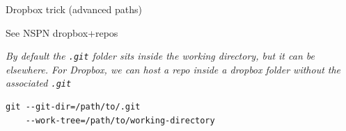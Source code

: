 \begin{frame}[fragile]{Dropbox trick (advanced paths)}
  
  See NSPN dropbox+repos


  \itshape\color{gray}
  By default the {\upshape\texttt{.git}} folder sits inside the working
  directory, but it can be elsewhere. For Dropbox, we can host a repo
  inside a dropbox folder without the associated {\upshape\texttt{.git}}
\begin{verbatim}
git --git-dir=/path/to/.git 
    --work-tree=/path/to/working-directory
\end{verbatim}


\end{frame}
















